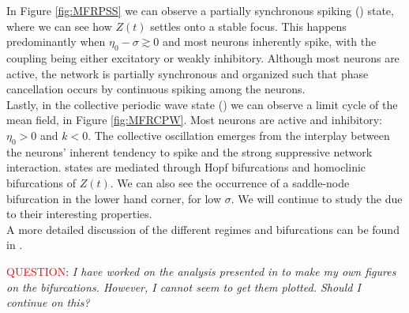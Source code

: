 In Figure \ref{fig:MFRPSS} we can observe a partially synchronous spiking (\PSS) state, where we can see how $Z(t)$ settles onto a stable focus. This happens predominantly when $\eta_0 - \sigma \gtrsim 0$ and most neurons inherently spike, with the coupling being either excitatory or weakly inhibitory. Although most neurons are active, the network is partially synchronous and organized such that phase cancellation occurs by continuous spiking among the neurons.\\

Lastly, in the collective periodic wave state (\CPW) we can observe a limit cycle of the mean field, in Figure \ref{fig:MFRCPW}. Most neurons are active and inhibitory: $\eta_0 > 0$ and $k < 0$. The collective oscillation emerges from the interplay between the neurons’ inherent tendency to spike and the strong suppressive network interaction. \CPW states are mediated through Hopf bifurcations and homoclinic bifurcations of $Z(t)$. We can also see the occurrence of a saddle-node bifurcation in the lower hand corner, for low $\sigma$. We will continue to study the \CPW due to their interesting properties.\\

A more detailed discussion of the different regimes and bifurcations can be found in \cite{Luke2013}.

\textcolor{red}{QUESTION}: \textsl{I have worked on the analysis presented in \cite{Luke2013} to make my own figures on the bifurcations. However, I cannot seem to get them plotted. Should I continue on this?}

